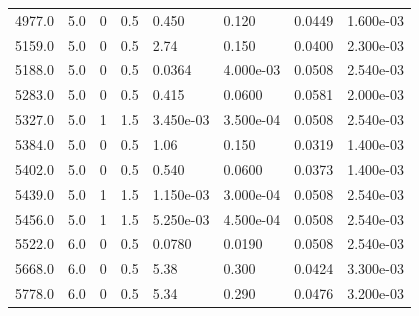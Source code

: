 \documentclass[preview]{standalone}
\begin{document}
{{{\begin{tabular}{L{1.2cm}C{1.2cm} C{0.3cm}C{0.5cm} C{1.4cm}C{1.4cm} C{1.4cm}C{1.4cm}}
  4977.0  &   5.0  & 0     & 0.5 &  0.450  & 0.120  & 0.0449 &  1.600e-03   \\ 
  5159.0  &   5.0  & 0     & 0.5 &  2.74  & 0.150  & 0.0400 &  2.300e-03   \\ 
  5188.0  &   5.0  & 0     & 0.5 &  0.0364  & 4.000e-03  & 0.0508 &  2.540e-03   \\ 
  5283.0  &   5.0  & 0     & 0.5 &  0.415  & 0.0600  & 0.0581 &  2.000e-03   \\ 
  5327.0  &   5.0  & 1     & 1.5 &  3.450e-03  & 3.500e-04  & 0.0508 &  2.540e-03   \\ 
  5384.0  &   5.0  & 0     & 0.5 &  1.06  & 0.150  & 0.0319 &  1.400e-03   \\ 
  5402.0  &   5.0  & 0     & 0.5 &  0.540  & 0.0600  & 0.0373 &  1.400e-03   \\ 
  5439.0  &   5.0  & 1     & 1.5 &  1.150e-03  & 3.000e-04  & 0.0508 &  2.540e-03   \\ 
  5456.0  &   5.0  & 1     & 1.5 &  5.250e-03  & 4.500e-04  & 0.0508 &  2.540e-03   \\ 
  5522.0  &   6.0  & 0     & 0.5 &  0.0780  & 0.0190  & 0.0508 &  2.540e-03   \\ 
  5668.0  &   6.0  & 0     & 0.5 &  5.38  & 0.300  & 0.0424 &  3.300e-03   \\ 
  5778.0  &   6.0  & 0     & 0.5 &  5.34  & 0.290  & 0.0476 &  3.200e-03   \\ 
\hline 
\end{tabular} 

}}}
\end{document}
